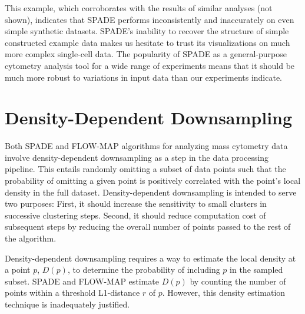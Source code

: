 \documentclass{article}
\begin{document}




This example, which corroborates with the results of similar analyses (not shown), indicates that SPADE performs inconsistently and inaccurately on even simple synthetic datasets. 
 SPADE's inability to recover the structure of simple constructed example data makes us hesitate to trust its visualizations on much more complex single-cell data. The popularity of SPADE as a general-purpose cytometry analysis tool for a wide range of experiments means that it should be much more robust to variations in input data than our experiments indicate. 



\section{Density-Dependent Downsampling}
\label{sec:downsampling}
Both SPADE and FLOW-MAP algorithms for analyzing mass cytometry data involve density-dependent downsampling as a step in the data processing pipeline. This entails randomly omitting a subset of data points such that the probability of omitting a given point is positively correlated with the point’s local density in the full dataset.  Density-dependent downsampling is intended to serve two purposes:  First, it should increase the sensitivity to small clusters in successive clustering steps. Second, it should reduce computation cost of subsequent steps by reducing the overall number of points passed to the rest of the algorithm.

Density-dependent downsampling requires a way to estimate the local density at a point $p$, $D(p)$, to determine the probability of including $p$ in the sampled subset.  SPADE and FLOW-MAP estimate $D(p)$ by counting the number of points within a threshold L1-distance $r$ of $p$. However, this density estimation technique is inadequately justified.
\end{document}
